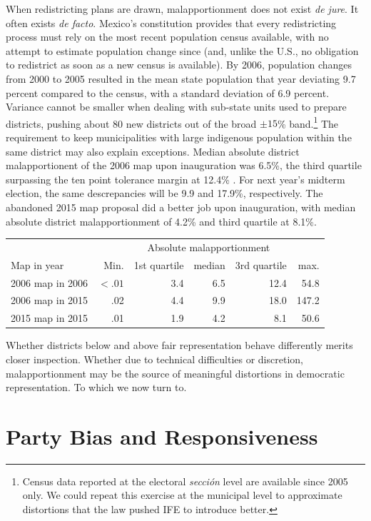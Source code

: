 \documentclass[letter,12pt]{article}
\newcommand{\mc}{\multicolumn}
\begin{document}
When redistricting plans are drawn, malapportionment does not exist \emph{de jure}. It often exists \emph{de facto}. Mexico's constitution provides that every redistricting process must rely on the most recent population census available, with no attempt to estimate population change since (and, unlike the U.S., no obligation to redistrict as soon as a new census is available). By 2006, population changes from 2000 to 2005 resulted in the mean state population that year deviating 9.7 percent compared to the census, with a standard deviation of 6.9 percent. Variance cannot be smaller when dealing with sub-state units used to prepare districts, pushing about 80 new districts out of the broad $\pm 15$\% band.\footnote{Census data reported at the electoral \emph{secci\'on} level are available since 2005 only. We could repeat this exercise at the municipal level to approximate distortions that the law pushed IFE to introduce better.} The requirement to keep municipalities with large indigenous population within the same district may also explain exceptions. Median absolute district malapportionent of the 2006 map upon inauguration was 6.5\%, the third quartile surpassing the ten point tolerance margin at 12.4\% \citep[also,][]{trelles.mtz.tesisItam.2007}. For next year's midterm election, the same descrepancies will be 9.9 and 17.9\%, respectively. The abandoned 2015 map proposal did a better job upon inauguration, with median absolute district malapportionment of 4.2\% and third quartile at 8.1\%. 

\begin{tabular}{lrrrrr}
                 & \mc{5}{c}{Absolute malapportionment} \\
Map in year      & Min. & 1st quartile & median & 3rd quartile & max. \\ \hline
2006 map in 2006 & $<.01$ & 3.4 & 6.5 & 12.4 & 54.8 \\
2006 map in 2015 & .02 & 4.4 & 9.9 & 18.0 & 147.2 \\
2015 map in 2015 & .01 & 1.9 & 4.2 & 8.1 & 50.6 \\
\end{tabular}

Whether districts below and above fair representation behave differently merits closer inspection. Whether due to technical difficulties or discretion, malapportionment may be the source of meaningful distortions in democratic representation. To which we now turn to. 

\section{Party Bias and Responsiveness}
\end{document}
